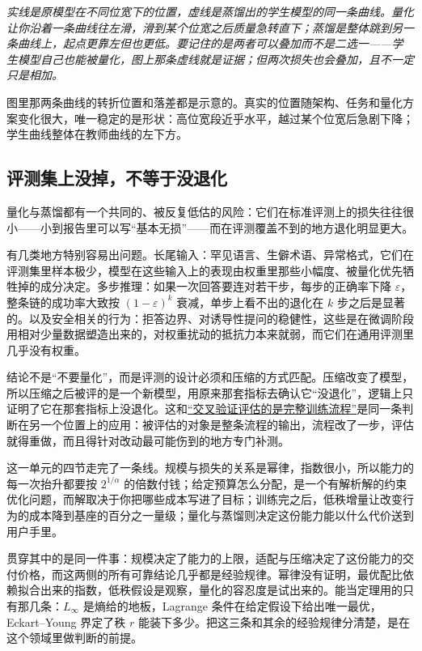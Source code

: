 \emph{实线是原模型在不同位宽下的位置，虚线是蒸馏出的学生模型的同一条曲线。量化让你沿着一条曲线往左滑，滑到某个位宽之后质量急转直下；蒸馏是整体跳到另一条曲线上，起点更靠左但也更低。要记住的是两者可以叠加而不是二选一——学生模型自己也能被量化，图上那条虚线就是证据；但两次损失也会叠加，且不一定只是相加。}

图里那两条曲线的转折位置和落差都是示意的。真实的位置随架构、任务和量化方案变化很大，唯一稳定的是形状：高位宽段近乎水平，越过某个位宽后急剧下降；学生曲线整体在教师曲线的左下方。

\subsection{评测集上没掉，不等于没退化}

量化与蒸馏都有一个共同的、被反复低估的风险：它们在标准评测上的损失往往很小——小到报告里可以写``基本无损''——而在评测覆盖不到的地方退化明显更大。

有几类地方特别容易出问题。长尾输入：罕见语言、生僻术语、异常格式，它们在评测集里样本极少，模型在这些输入上的表现由权重里那些小幅度、被量化优先牺牲掉的成分决定。多步推理：如果一次回答要连对若干步，每步的正确率下降 \(\varepsilon\)，整条链的成功率大致按 \((1 - \varepsilon)^{k}\) 衰减，单步上看不出的退化在 \(k\) 步之后是显著的。以及安全相关的行为：拒答边界、对诱导性提问的稳健性，这些是在微调阶段用相对少量数据塑造出来的，对权重扰动的抵抗力本来就弱，而它们在通用评测里几乎没有权重。

结论不是``不要量化''，而是评测的设计必须和压缩的方式匹配。压缩改变了模型，所以压缩之后被评的是一个新模型，用原来那套指标去确认它``没退化''，逻辑上只证明了它在那套指标上没退化。这和\hyperref[sec:11-Mathematical-Statistics/06-Resampling-and-Model-Selection/03]{``交叉验证评估的是完整训练流程''}是同一条判断在另一个位置上的应用：被评估的对象是整条流程的输出，流程改了一步，评估就得重做，而且得针对改动最可能伤到的地方专门补测。

\medskip

这一单元的四节走完了一条线。规模与损失的关系是幂律，指数很小，所以能力的每一次抬升都要按 \(2^{1/\alpha}\) 的倍数付钱；给定预算怎么分配，是一个有解析解的约束优化问题，而解取决于你把哪些成本写进了目标；训练完之后，低秩增量让改变行为的成本降到基座的百分之一量级；量化与蒸馏则决定这份能力能以什么代价送到用户手里。

贯穿其中的是同一件事：规模决定了能力的上限，适配与压缩决定了这份能力的交付价格，而这两侧的所有可靠结论几乎都是经验规律。幂律没有证明，最优配比依赖拟合出来的指数，低秩假设是观察，量化的容忍度是试出来的。能当定理用的只有那几条：\(L_\infty\) 是熵给的地板，Lagrange 条件在给定假设下给出唯一最优，Eckart--Young 界定了秩 \(r\) 能装下多少。把这三条和其余的经验规律分清楚，是在这个领域里做判断的前提。
